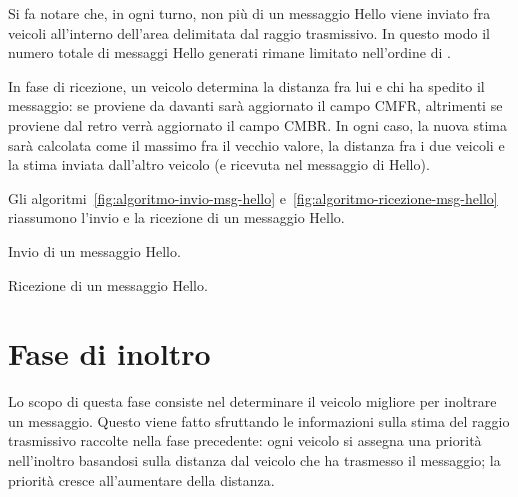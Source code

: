 Si fa notare che, in ogni turno, non più di un messaggio Hello viene inviato fra veicoli all'interno dell'area delimitata dal raggio trasmissivo.
In questo modo il numero totale di messaggi Hello generati rimane limitato nell'ordine di .

In fase di ricezione, un veicolo determina la distanza fra lui e chi ha spedito il messaggio: se proviene da davanti sarà aggiornato il campo CMFR,
altrimenti se proviene dal retro verrà aggiornato il campo CMBR.
In ogni caso, la nuova stima sarà calcolata come il massimo fra il vecchio valore, la distanza fra i due veicoli e la stima inviata dall'altro veicolo
(e ricevuta nel messaggio di Hello).

Gli algoritmi~\ref{fig:algoritmo-invio-msg-hello} e~\ref{fig:algoritmo-ricezione-msg-hello} riassumono l'invio e la ricezione di un messaggio Hello.
%
\begin{italianalgorithm}[h]
\caption{Invio di un messaggio Hello.}\label{fig:algoritmo-invio-msg-hello}
\begin{algorithmic}[1]
		\EndIf{}
	\EndFor{}
\end{algorithmic}
\end{italianalgorithm}
%
\begin{italianalgorithm}[h]
\caption{Ricezione di un messaggio Hello.}\label{fig:algoritmo-ricezione-msg-hello}
\begin{algorithmic}[1]
\end{algorithmic}
\end{italianalgorithm}
%
\section{Fase di inoltro}\label{sec:fb-fase-inoltro}
Lo scopo di questa fase consiste nel determinare il veicolo migliore per inoltrare un messaggio.
Questo viene fatto sfruttando le informazioni sulla stima del raggio trasmissivo raccolte nella fase precedente:
ogni veicolo si assegna una priorità nell'inoltro basandosi sulla distanza dal veicolo che ha trasmesso il messaggio;
la priorità cresce all'aumentare della distanza.

